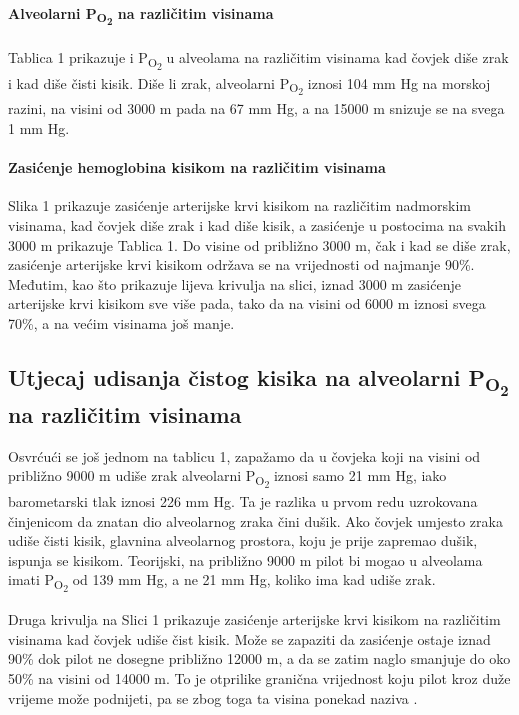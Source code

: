 \documentclass[12pt]{article}
\newcommand{\sub}[1]{\textsubscript{#1}}
\newcommand{\paro}{P\sub{O\sub{2}}}
\newcommand{\tl}{mm Hg}
\begin{document}
\paragraph{Alveolarni \paro{} na različitim visinama} Tablica 1 prikazuje i \paro{}
u alveolama na različitim visinama kad čovjek diše zrak i kad diše čisti kisik.
Diše li zrak, alveolarni \paro{} iznosi 104 \tl{} na morskoj razini, na visini od
3000 m pada na 67 \tl{}, a na 15000 m snizuje se na svega 1 \tl{}.

\paragraph{Zasićenje hemoglobina kisikom na različitim visinama} Slika 1
prikazuje zasićenje arterijske krvi kisikom na različitim nadmorskim visinama,
kad čovjek diše zrak i kad diše kisik, a zasićenje u postocima na svakih 3000 m
prikazuje Tablica 1. Do visine od približno 3000 m, čak i kad se diše zrak,
zasićenje arterijske krvi kisikom održava se na vrijednosti od najmanje 90\%.
Međutim, kao što prikazuje lijeva krivulja na slici, iznad 3000 m zasićenje
arterijske krvi kisikom sve više pada, tako da na visini od 6000 m iznosi svega
70\%, a na većim visinama još manje.

\subsection{Utjecaj udisanja čistog kisika na alveolarni \paro{} na različitim
    visinama}

Osvrćući se još jednom na tablicu 1, zapažamo da u čovjeka koji na visini od
približno 9000 m udiše zrak alveolarni \paro{} iznosi samo 21 \tl{}, iako
barometarski tlak iznosi 226 \tl{}. Ta je razlika u prvom redu uzrokovana
činjenicom da znatan dio alveolarnog zraka čini dušik. Ako čovjek umjesto zraka
udiše čisti kisik, glavnina alveolarnog prostora, koju je prije zapremao dušik,
ispunja se kisikom. Teorijski, na približno 9000 m pilot bi mogao u alveolama
imati \paro{} od 139 \tl{}, a ne 21 \tl{}, koliko ima kad udiše zrak.

Druga krivulja na Slici 1 prikazuje zasićenje arterijske krvi kisikom na
različitim visinama kad čovjek udiše čist kisik. Može se zapaziti da zasićenje
ostaje iznad 90\% dok pilot ne dosegne približno 12000 m, a da se zatim naglo
smanjuje do oko 50\% na visini od 14000 m. To je otprilike granična vrijednost
koju pilot kroz duže vrijeme može podnijeti, pa se zbog toga ta visina ponekad
naziva .
\end{document}
